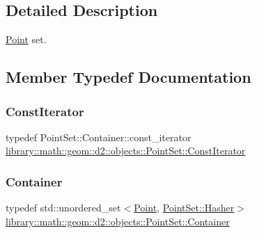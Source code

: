 \subsection{Detailed Description}
\hyperlink{classlibrary_1_1math_1_1geom_1_1d2_1_1objects_1_1_point}{Point} set. 

\subsection{Member Typedef Documentation}
\mbox{\label{classlibrary_1_1math_1_1geom_1_1d2_1_1objects_1_1_point_set_ad4c4f52fdc966f0d2031402edefc9e98}} 
\subsubsection{\texorpdfstring{Const\+Iterator}{ConstIterator}}
{\footnotesize\ttfamily typedef Point\+Set\+::\+Container\+::const\+\_\+iterator \hyperlink{classlibrary_1_1math_1_1geom_1_1d2_1_1objects_1_1_point_set_ad4c4f52fdc966f0d2031402edefc9e98}{library\+::math\+::geom\+::d2\+::objects\+::\+Point\+Set\+::\+Const\+Iterator}}

\mbox{\label{classlibrary_1_1math_1_1geom_1_1d2_1_1objects_1_1_point_set_a4ad340e72ff6c1a80199804754cd1af9}} 
\subsubsection{\texorpdfstring{Container}{Container}}
{\footnotesize\ttfamily typedef std\+::unordered\+\_\+set$<$\hyperlink{classlibrary_1_1math_1_1geom_1_1d2_1_1objects_1_1_point}{Point}, \hyperlink{structlibrary_1_1math_1_1geom_1_1d2_1_1objects_1_1_point_set_1_1_hasher}{Point\+Set\+::\+Hasher}$>$ \hyperlink{classlibrary_1_1math_1_1geom_1_1d2_1_1objects_1_1_point_set_a4ad340e72ff6c1a80199804754cd1af9}{library\+::math\+::geom\+::d2\+::objects\+::\+Point\+Set\+::\+Container}}



